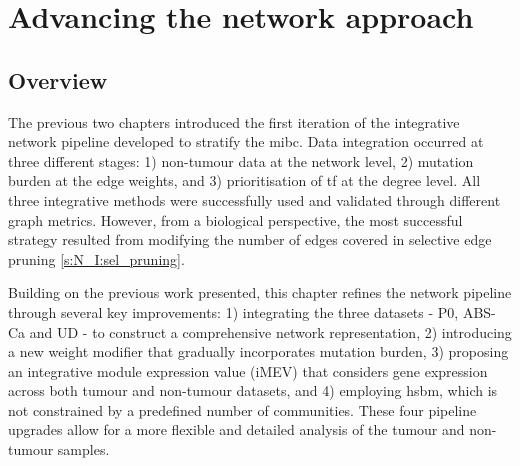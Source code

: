 
\chapter{Advancing the network approach} \label{s:N_II}


\vspace{3mm}
\vspace{3mm}


\section{Overview}

The previous two chapters introduced the first iteration of the integrative network pipeline developed to stratify the \acrfull{mibc}. Data integration occurred at three different stages: 1) non-tumour data at the network level, 2) mutation burden at the edge weights, and 3) prioritisation of \acrfull{tf} at the degree level. All three integrative methods were successfully used and validated through different graph metrics. However, from a biological perspective, the most successful strategy resulted from modifying the number of edges covered in selective edge pruning \cref{s:N_I:sel_pruning}.


Building on the previous work presented, this chapter refines the network pipeline through several key improvements: 1) integrating the three datasets - P0, ABS-Ca and UD - to construct a comprehensive network representation, 2) introducing a new weight modifier that gradually incorporates mutation burden, 3) proposing an integrative module expression value (iMEV) that considers gene expression across both tumour and non-tumour datasets, and 4) employing \acrfull{hsbm}, which is not constrained by a predefined number of communities. These four pipeline upgrades allow for a more flexible and detailed analysis of the tumour and non-tumour samples.


